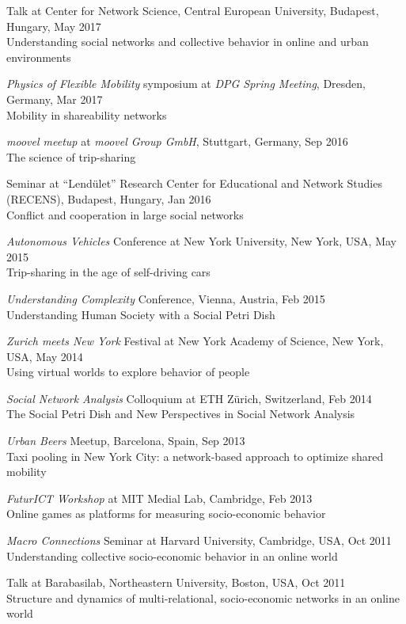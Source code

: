 \documentclass[10pt,a4paper]{article}
\renewenvironment{itemize}{
  \begin{list}{}{
    \setlength{\leftmargin}{1.5em}
    \setlength{\itemsep}{0.25em}
    \setlength{\parskip}{0pt}
    \setlength{\parsep}{0.25em}
  }
}{
  \end{list}
}
\begin{document}
\begin{itemize}
\item{Talk at Center for Network Science, Central European University, Budapest, Hungary, May 2017\\ {Understanding social networks and collective behavior in online and urban environments}}
\item{\emph{Physics of Flexible Mobility} symposium at \emph{DPG Spring Meeting}, Dresden, Germany, Mar 2017\\ {Mobility in shareability networks}}
\item{\emph{moovel meetup} at \emph{moovel Group GmbH}, Stuttgart, Germany, Sep 2016\\ {The science of trip-sharing}}
\item{Seminar at ``Lend\"ulet'' Research Center for Educational and Network Studies (RECENS), Budapest, Hungary, Jan 2016\\Conflict and cooperation in large social networks}
\item{\emph{Autonomous Vehicles} Conference at New York University, New York, USA, May 2015\\Trip-sharing in the age of self-driving cars}
\item{\emph{Understanding Complexity} Conference, Vienna, Austria, Feb 2015\\Understanding Human Society with a Social Petri Dish}
\item{\emph{Zurich meets New York} Festival at New York Academy of Science, New York, USA, May 2014\\Using virtual worlds to explore behavior of people}
\item{\emph{Social Network Analysis} Colloquium at ETH Z{\"u}rich, Switzerland, Feb 2014\\The Social Petri Dish and New Perspectives in Social Network Analysis}
\item{\emph{Urban Beers} Meetup, Barcelona, Spain, Sep 2013\\Taxi pooling in New York City: a network-based approach to optimize shared mobility}
\item{\emph{FuturICT Workshop} at MIT Medial Lab, Cambridge, Feb 2013\\{Online games as platforms for measuring socio-economic behavior}}
\item{\emph{Macro Connections} Seminar at Harvard University, Cambridge, USA, Oct 2011\\Understanding collective socio-economic behavior in an online world}
\item{Talk at Barabasilab, Northeastern University, Boston, USA, Oct 2011\\Structure and dynamics of multi-relational, socio-economic networks in an online world}

\end{itemize}
\end{document}
